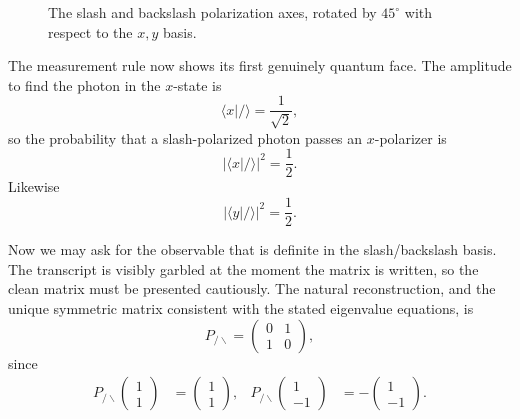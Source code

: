 \begin{figure}
\centering
{}
\caption{The slash and backslash polarization axes, rotated by \(45^\circ\) with respect to the \(x,y\) basis.}
\end{figure}

The measurement rule now shows its first genuinely quantum face. The amplitude to find the photon in the \(x\)-state is
\begin{equation}
\langle x|/\rangle=\frac{1}{\sqrt2},
\end{equation}
so the probability that a slash-polarized photon passes an \(x\)-polarizer is
\begin{equation}
|\langle x|/\rangle|^2=\frac12.
\end{equation}
Likewise
\begin{equation}
|\langle y|/\rangle|^2=\frac12.
\end{equation}

Now we may ask for the observable that is definite in the slash/backslash basis. The transcript is visibly garbled at the moment the matrix is written, so the clean matrix must be presented cautiously. The natural reconstruction, and the unique symmetric matrix consistent with the stated eigenvalue equations, is
\begin{equation}
P_{/\backslash}=
\begin{pmatrix}
0&1\\
1&0
\end{pmatrix},
\end{equation}
since
\begin{align}
P_{/\backslash}
\begin{pmatrix}
1\\
1
\end{pmatrix}
&=
\begin{pmatrix}
1\\
1
\end{pmatrix},
&
P_{/\backslash}
\begin{pmatrix}
1\\
-1
\end{pmatrix}
&=
-
\begin{pmatrix}
1\\
-1
\end{pmatrix}.
\end{align}


